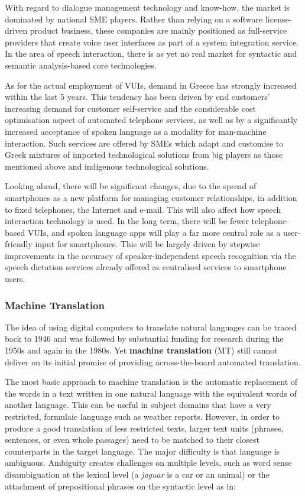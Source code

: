 \begin{multicols}{2}
With regard to dialogue management technology and know-how, the market is dominated by national SME players. Rather than relying on a software license-driven product business, these companies are mainly positioned as full-service providers that create voice user interfaces as part of a system integration service. In the area of speech interaction, there is as yet no real market for syntactic and semantic analysis-based core technologies.

As for the actual employment of VUIs, demand in Greece has strongly increased within the last 5 years. This tendency has been driven by end customers’ increasing demand for customer self-service and the considerable cost optimisation aspect of automated telephone services, as well as by a significantly increased acceptance of spoken language as a modality for man-machine interaction. Such services are offered by SMEs which adapt and customise to Greek mixtures of imported technological solutions from big players as those mentioned above and indigenous technological solutions.

Looking ahead, there will be significant changes, due to the spread of smartphones as a new platform for managing customer relationships, in addition to fixed telephones, the Internet and e-mail. This will also affect how speech interaction technology is used. In the long term, there will be fewer telephone-based VUIs, and spoken language apps will play a far more central role as a user-friendly input for smartphones. This will be largely driven by stepwise improvements in the accuracy of speaker-independent speech recognition via the speech dictation services already offered as centralised services to smartphone users.

\subsubsection{Machine Translation}

The idea of using digital computers to translate natural languages can be traced back to 1946 and was followed by substantial funding for research during the 1950s and again in the 1980s. Yet \textbf{machine translation} (MT) still cannot deliver on its initial promise of providing across-the-board automated translation.


The most basic approach to machine translation is the automatic replacement of the words in a text written in one natural language with the equivalent words of another language. This can be useful in subject domains that have a very restricted, formulaic language such as weather reports. However, in order to produce a good translation of less restricted texts, larger text units (phrases, sentences, or even whole passages) need to be matched to their closest counterparts in the target language. The major difficulty is that language is ambiguous. Ambiguity creates challenges on multiple levels, such as word sense disambiguation at the lexical level (a \textit{jaguar} is a car or an animal) or the attachment of prepositional phrases on the syntactic level as in:


\end{multicols}
